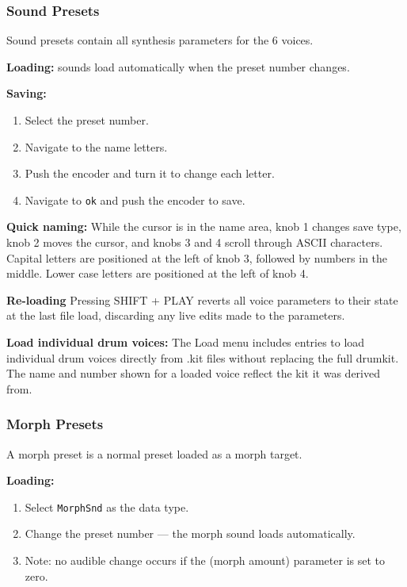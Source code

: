 
\subsubsection{Sound Presets}\label{sound-presets}

Sound presets contain all synthesis parameters for the 6 voices.

\textbf{Loading:} sounds load automatically when the preset number
changes.

\textbf{Saving:}

\begin{enumerate}
\def\labelenumi{\arabic{enumi}.}
\tightlist
\item
  Select the preset number.
\item
  Navigate to the name letters.
\item
  Push the encoder and turn it to change each letter.
\item
  Navigate to \texttt{ok} and push the encoder to save.
\end{enumerate}

\textbf{Quick naming:} While the cursor is in the name area, knob 1
changes save type, knob 2 moves the cursor, and knobs 3 and 4 scroll
through ASCII characters. Capital letters are positioned at the left of
knob 3, followed by numbers in the middle. Lower case letters are
positioned at the left of knob 4.

\textbf{Re-loading} Pressing SHIFT + PLAY reverts all voice parameters
to their state at the last file load, discarding any live edits made to
the parameters.

\textbf{Load individual drum voices:} The Load menu includes entries to
load individual drum voices directly from .kit files without replacing
the full drumkit. The name and number shown for a loaded voice reflect
the kit it was derived from.

\subsubsection{Morph Presets}\label{morph-presets}

A morph preset is a normal preset loaded as a morph target.

\textbf{Loading:}

\begin{enumerate}
\def\labelenumi{\arabic{enumi}.}
\tightlist
\item
  Select \texttt{MorphSnd} as the data type.
\item
  Change the preset number --- the morph sound loads automatically.
\item
  Note: no audible change occurs if the  (morph amount)
  parameter is set to zero.
\end{enumerate}

